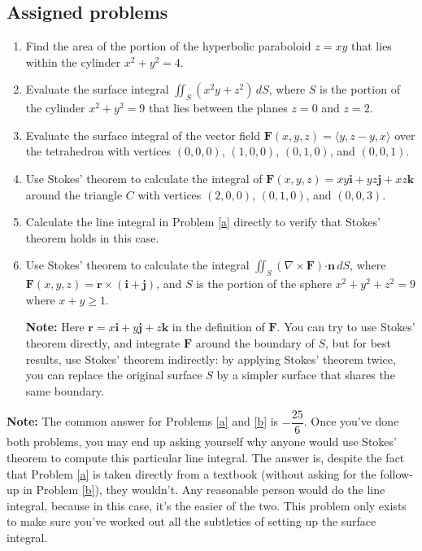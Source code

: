 \documentclass[letterpaper,12pt]{article}
\newcommand{\F}{\mathbf{F}}
\newcommand{\dotp}{\boldsymbol{\cdot}}
\renewcommand{\r}{\mathbf{r}}
\newcommand{\n}{\mathbf{n}}
\renewcommand{\i}{\mathbf{i}}
\renewcommand{\j}{\mathbf{j}}
\renewcommand{\k}{\mathbf{k}}
\begin{document}
\subsection*{Assigned problems}
\begin{enumerate}
\item Find the area of the portion of the hyperbolic paraboloid $z=xy$ that lies within the cylinder $x^2+y^2=4$.
\item Evaluate the surface integral $\iint_S(x^2y+z^2)\,dS$, where $S$ is the portion of the cylinder $x^2+y^2=9$ that lies between the planes $z=0$ and $z=2$.
\item Evaluate the surface integral of the vector field $\F(x,y,z) = \langle y, z-y, x\rangle$ over the tetrahedron with vertices $(0,0,0)$, $(1,0,0)$, $(0,1,0)$, and $(0,0,1)$.
\item Use Stokes' theorem to calculate the integral of $\F(x,y,z) = xy\i+yz\j+xz\k$ around the triangle $C$ with vertices $(2,0,0)$, $(0,1,0)$, and $(0,0,3)$.\label{a}
\item Calculate the line integral in Problem \ref{a} directly to verify that Stokes' theorem holds in this case. \label{b}
\item Use Stokes' theorem to calculate the integral $\iint_S(\nabla\times \F)\dotp \n\,dS$, where $\F(x,y,z) = \r\times(\i+\j)$, and $S$ is the portion of the sphere $x^2+y^2+z^2=9$ where $x+y\geq 1$.

\textbf{Note:} Here $\r = x\i+y\j+z\k$ in the definition of $\F$. You can try to use Stokes' theorem directly, and integrate $\F$ around the boundary of $S$, but for best results, use Stokes' theorem indirectly: by applying Stokes' theorem twice, you can replace the original surface $S$ by a simpler surface that shares the same boundary.

\bigskip


\end{enumerate}
\textbf{Note:} The common answer for Problems \ref{a} and \ref{b} is $-\dfrac{25}{6}$. Once you've done both problems, you may end up asking yourself why anyone would use Stokes' theorem to compute this particular line integral. The answer is, despite the fact that Problem \ref{a} is taken directly from a textbook (without asking for the follow-up in Problem \ref{b}), they wouldn't. Any reasonable person would do the line integral, because in this case, it's the easier of the two. This problem only exists to make sure you've worked out all the subtleties of setting up the surface integral.
\end{document}
